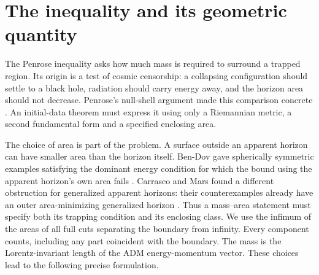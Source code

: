 \section{The inequality and its geometric quantity}
\label{sec:introduction}
The Penrose inequality asks how much mass is required to surround a
trapped region. Its origin is a test of cosmic censorship: a collapsing
configuration should settle to a black hole, radiation should carry
energy away, and the horizon area should not decrease. Penrose's
null-shell argument made this comparison concrete \cite{Penrose1973}.
An initial-data theorem must express it using only a Riemannian metric,
a second fundamental form and a specified enclosing area.

The choice of area is part of the problem. A surface outside an apparent
horizon can have smaller area than the horizon itself. Ben-Dov gave
spherically symmetric examples satisfying the dominant energy condition
for which the bound using the apparent horizon's own area fails
\cite{BenDov2004}. Carrasco and Mars found a different obstruction
for generalized apparent horizons: their counterexamples already have
an outer area-minimizing generalized horizon \cite{CarrascoMars2010}.
Thus a mass--area statement must specify both its trapping condition
and its enclosing class. We use the infimum of the areas of all full cuts
separating the boundary from infinity. Every component counts, including
any part coincident with the boundary. The mass is the Lorentz-invariant
length of the ADM energy-momentum vector. These choices lead to the
following precise formulation.

